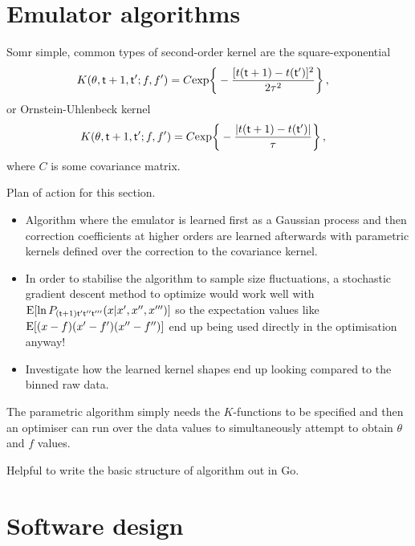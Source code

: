 \section{\sffamily Emulator algorithms}

Somr simple, common types of second-order kernel are the square-exponential
\begin{align}
K(\theta , {\sf t}+1, {\sf t}'; f, f') &= C {\rm exp}\bigg\{ -\frac{[t({\sf t}+1)-t({\sf t}')]^2}{2\tau^2}\bigg\} \,, 
\end{align}
or Ornstein-Uhlenbeck kernel
\begin{align}
K(\theta , {\sf t}+1, {\sf t}'; f, f') &= C {\rm exp}\bigg\{ -\frac{\vert t({\sf t}+1)-t({\sf t}')\vert}{\tau}\bigg\} \,,
\end{align}
where $C$ is some covariance matrix.



Plan of action for this section.
\begin{itemize}
\item{Algorithm where the emulator is learned first as a Gaussian process and then correction coefficients at higher orders are learned afterwards with parametric kernels defined over the correction to the covariance kernel.}
\item{In order to stabilise the algorithm to sample size fluctuations, a stochastic gradient descent method to optimize would work well with ${\rm E}[\ln P_{({\sf t}+1){\sf t}'{\sf t}''{\sf t}'''}(x\vert x', x'', x''')]$ so the expectation values like ${\rm E}[(x-f)(x'-f')(x''-f'')]$ end up being used directly in the optimisation anyway!}
\item{Investigate how the learned kernel shapes end up looking compared to the binned raw data.}
\end{itemize}

The parametric algorithm simply needs the $K$-functions to be specified and then an optimiser can run over the data values to simultaneously attempt to obtain $\theta$ and $f$ values. 

Helpful to write the basic structure of algorithm out in Go.

\section{\sffamily Software design}

